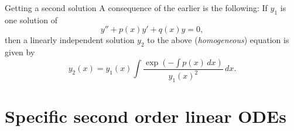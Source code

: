 \documentclass[dvipsnames]{beamer}
\theoremstyle{definition}
\begin{document}
\begin{frame}{Getting a second solution}
  A consequence of the earlier is the following: \pause If $y_{1}$ is one solution of
  \begin{equation*} 
    y'' + p(x) y' + q(x) y = 0,
  \end{equation*} \pause 
  then a linearly independent solution $y_{2}$ to the above (\emph{homogeneous}) equation is given by \pause
  \begin{equation*} 
    y_{2}(x) = y_{1}(x) \int \frac{\exp\left(-\int p(x) \, dx\right)}{y_{1}(x)^{2}} \, dx.
  \end{equation*}
\end{frame}

\section{Specific second order linear ODEs}
\end{document}
